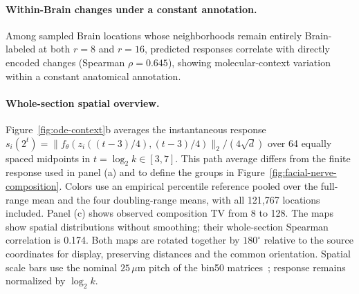 \paragraph{Within-Brain changes under a constant annotation.}
Among sampled Brain locations whose neighborhoods remain entirely Brain-labeled at both $r=8$ and $r=16$, predicted responses correlate with directly encoded changes (Spearman $\rho=0.645$), showing molecular-context variation within a constant anatomical annotation.

\paragraph{Whole-section spatial overview.}
Figure~\ref{fig:ode-context}b averages the instantaneous response $s_i(2^t)=\|f_\theta(z_i((t-3)/4),(t-3)/4)\|_2/(4\sqrt d)$ over 64 equally spaced midpoints in $t=\log_2 k\in[3,7]$. This path average differs from the finite response used in panel (a) and to define the groups in Figure~\ref{fig:facial-nerve-composition}. Colors use an empirical percentile reference pooled over the full-range mean and the four doubling-range means, with all 121,767 locations included. Panel (c) shows observed composition TV from 8 to 128. The maps show spatial distributions without smoothing; their whole-section Spearman correlation is 0.174. Both maps are rotated together by $180^\circ$ relative to the source coordinates for display, preserving distances and the common orientation. Spatial scale bars use the nominal $25\,\mu$m pitch of the bin50 matrices~\citep{chen2022mosta}; response remains normalized by $\log_2 k$.

